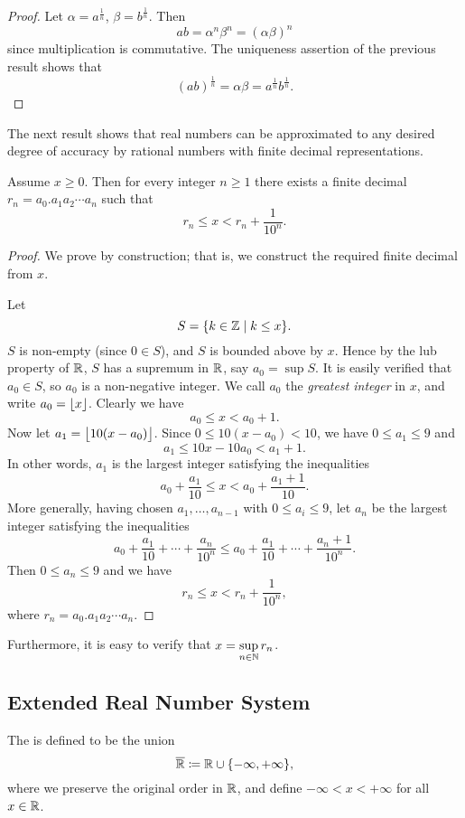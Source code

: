 \begin{proof}
Let $\alpha=a^\frac{1}{n}$, $\beta=b^\frac{1}{n}$. Then
\[ab=\alpha^n\beta^n=(\alpha\beta)^n\]
since multiplication is commutative. The uniqueness assertion of the previous result shows that
\[(ab)^\frac{1}{n}=\alpha\beta=a^\frac{1}{n}b^\frac{1}{n}.\]
\end{proof}

The next result shows that real numbers can be approximated to any desired degree of accuracy by rational numbers with finite decimal representations.

\begin{proposition}
Assume $x\ge0$. Then for every integer $n\ge1$ there exists a finite decimal $r_n=a_0.a_1a_2\cdots a_n$ such that
\[r_n\le x<r_n+\frac{1}{10^n}.\]
\end{proposition}

\begin{proof}
We prove by construction; that is, we construct the required finite decimal from $x$.

Let
\[S=\{k\in\mathbb Z\mid k\le x\}.\]
$S$ is non-empty (since $0\in S$), and $S$ is bounded above by $x$. Hence by the lub property of $\mathbb R$, $S$ has a supremum in $\mathbb R$, say $a_0=\sup S$. It is easily verified that $a_0\in S$, so $a_0$ is a non-negative integer. We call $a_0$ the \emph{greatest integer} in $x$, and write $a_0=\left\lfloor x \right\rfloor$. Clearly we have
\[a_0\le x<a_0+1.\]
Now let $a_1=\left\lfloor 10(x-a_0) \right\rfloor$. Since $0\le 10(x-a_0)<10$, we have $0\le a_1\le 9$ and
\[a_1\le 10x-10a_0<a_1+1.\]
In other words, $a_1$ is the largest integer satisfying the inequalities
\[a_0+\frac{a_1}{10}\le x<a_0+\frac{a_1+1}{10}.\]
More generally, having chosen $a_1,\dots,a_{n-1}$ with $0\le a_i\le 9$, let $a_n$ be the largest integer satisfying the inequalities
\[a_0+\frac{a_1}{10}+\cdots+\frac{a_n}{10^n}\le a_0+\frac{a_1}{10}+\cdots+\frac{a_n+1}{10^n}.\]
Then $0\le a_n\le 9$ and we have
\[r_n\le x<r_n+\frac{1}{10^n},\]
where $r_n=a_0.a_1a_2\cdots a_n$.
\end{proof}

Furthermore, it is easy to verify that $\displaystyle x=\sup_{n\in\mathbb N}r_n$.
\pagebreak

\subsection{Extended Real Number System}
\begin{definition}
The  is defined to be the union
\[\overline{\mathbb R}\coloneqq\mathbb R\cup\{-\infty,+\infty\},\]
where we preserve the original order in $\mathbb R$, and define $-\infty<x<+\infty$ for all $x\in\mathbb R$.
\end{definition}

